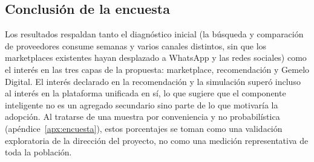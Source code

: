 \subsection{Conclusión de la encuesta}

Los resultados respaldan tanto el diagnóstico inicial (la búsqueda y
comparación de proveedores consume semanas y varios canales distintos,
sin que los marketplaces existentes hayan desplazado a WhatsApp y las
redes sociales) como el interés en las tres capas de la propuesta: marketplace,
recomendación y Gemelo Digital. El interés declarado en la recomendación
y la simulación superó incluso al interés en la plataforma unificada en
sí, lo que sugiere que el componente inteligente no es un agregado
secundario sino parte de lo que motivaría la adopción. Al tratarse de una
muestra por conveniencia y no probabilística (apéndice~\ref{apx:encuesta}),
estos porcentajes se toman como una validación exploratoria de la
dirección del proyecto, no como una medición representativa de toda la
población.
